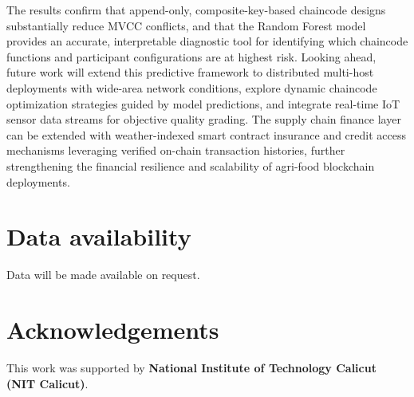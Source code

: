 \documentclass[manuscript,screen,nofonts]{acmart}
\begin{document}
	The results confirm that append-only, composite-key-based chaincode designs substantially reduce MVCC conflicts, and that the Random Forest model provides an accurate, interpretable diagnostic tool for identifying which chaincode functions and participant configurations are at highest risk. Looking ahead, future work will extend this predictive framework to distributed multi-host deployments with wide-area network conditions, explore dynamic chaincode optimization strategies guided by model predictions, and integrate real-time IoT sensor data streams for objective quality grading. The supply chain finance layer can be extended with weather-indexed smart contract insurance and credit access mechanisms leveraging verified on-chain transaction histories, further strengthening the financial resilience and scalability of agri-food blockchain deployments.
	
	\section*{Data availability}
	Data will be made available on request.
	
	\section*{Acknowledgements}
	This work was supported by \textbf{National Institute of Technology Calicut (NIT Calicut)}.
	
	
	\appendix
	

	
	
	

	
\end{document}
